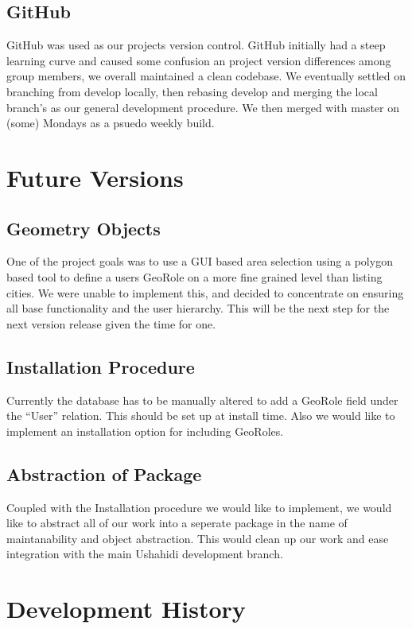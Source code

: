 \documentclass{article}
\begin{document}
\subsection{GitHub}
GitHub was used as our projects version control. GitHub initially had a steep learning curve and caused some confusion an project version differences among group members, we overall maintained a clean codebase. We eventually settled on branching from develop locally, then rebasing develop and merging the local branch's as our general development procedure. We then merged with master on (some) Mondays as a psuedo weekly build.

\section{Future Versions}
\subsection{Geometry Objects}
One of the project goals was to use a GUI based area selection using a polygon based tool to define a users GeoRole on a more fine grained level than listing cities. We were unable to implement this, and decided to concentrate on ensuring all base functionality and the user hierarchy. This will be the next step for the next version release given the time for one.

\subsection{Installation Procedure}
Currently the database has to be manually altered to add a GeoRole field under the ``User'' relation. This should be set up at install time. Also we would like to implement an installation option for including GeoRoles.

\subsection{Abstraction of Package}
Coupled with the Installation procedure we would like to implement, we would like to abstract all of our work into a seperate package in the name of maintanability and object abstraction. This would clean up our work and ease integration with the main Ushahidi development branch.

\section{Development History}
\end{document}
